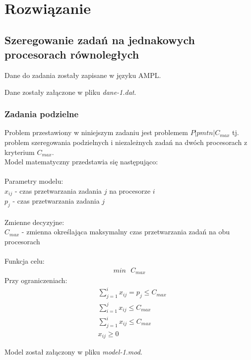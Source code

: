 \documentclass[
    12pt, %
]{../fphw}
\begin{document}
\newpage
\section{Rozwiązanie}
\subsection{Szeregowanie zadań na jednakowych procesorach równoległych}
Dane do zadania zostały zapisane w języku AMPL.

Dane zostały załączone w pliku \textit{dane-1.dat}.
\subsubsection{Zadania podzielne}
Problem przestawiony w niniejszym zadaniu jest problemem \(P|pmtn|C_{max}\) 
tj. problem szeregowania podzielnych i niezależnych zadań na dwóch procesorach z kryterium \(C_{max}\). \\
Model matematyczny przedstawia się następująco: \\ \\
Parametry modelu: \\
\(x_{ij}\) - czas przetwarzania zadania \(j\) na procesorze \(i\) \\
\(p_j\) - czas przetwarzania zadania \(j\) \\ \\
Zmienne decyzyjne: \\
\(C_{max}\) - zmienna określająca maksymalny czas przetwarzania zadań na obu procesorach \\ \\
Funkcja celu: \\
\begin{align*}
    min \text{ } C_{max}
\end{align*}
Przy ograniczeniach: \\
\begin{align*}
     & \sum^i_{j=1}x_{ij} = p_j \leq C_{max} \\
     & \sum^j_{i=1}x_{ij} \leq C_{max}    \\
     & \sum^i_{j=1}x_{ij} \leq C_{max}    \\
     & x_{ij} \geq 0
\end{align*}

\newpage


Model został załączony w pliku \textit{model-1.mod}.
\end{document}
